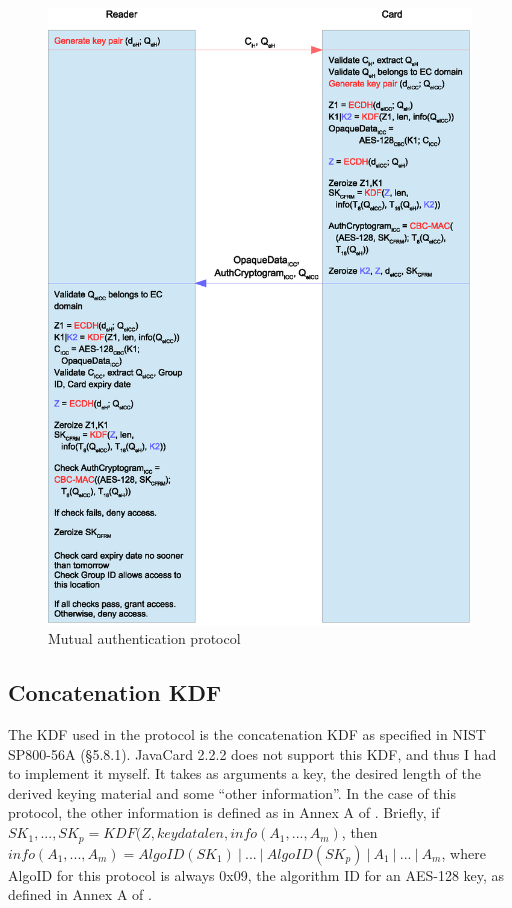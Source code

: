 \documentclass[12pt,a4paper,twoside,openright]{report}
\begin{document}
\begin{figure}[tbh]
\centerline{\includegraphics[scale=0.8]{figures/mutualauth.eps}}
\caption{Mutual authentication protocol}
\label{fig:mutualauth}
\end{figure}

\subsection{Concatenation KDF}

The KDF used in the protocol is the concatenation KDF as specified in NIST SP800-56A \cite{nistsp80056a} (\S5.8.1). JavaCard 2.2.2 does not support this KDF, and thus I had to implement it myself. It takes as arguments a key, the desired length of the derived keying material and some ``other information''. In the case of this protocol, the other information is defined as in Annex A of \cite{OPACITY}. Briefly, if $SK_1, ..., SK_p =  KDF(Z, keydatalen, info(A_1, ..., A_m)$, then $info(A_1, ..., A_m) = AlgoID(SK_1)~\vert~...~\vert~AlgoID(SK_p)~\vert~A_1~\vert~...~\vert~A_m$, where AlgoID for this protocol is always 0x09, the algorithm ID for an AES-128 key, as defined in Annex A of \cite{OPACITY}.
\end{document}
